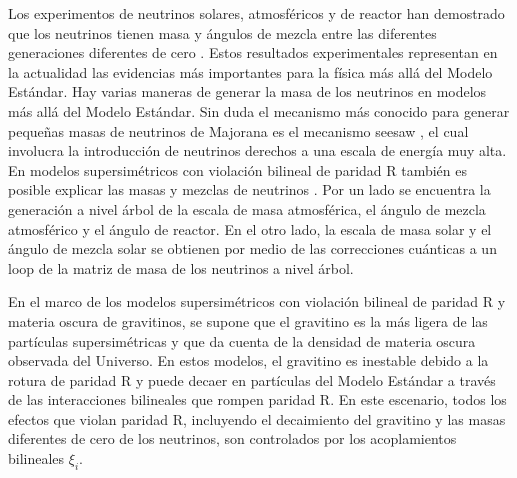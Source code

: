 Los experimentos de neutrinos solares, atmosféricos y de reactor han demostrado que los neutrinos tienen masa y ángulos de mezcla entre las diferentes generaciones diferentes de cero \cite{Ahmad:2002jz,Fukuda:1998mi,Eguchi:2002dm}. Estos resultados experimentales representan en la actualidad las evidencias más importantes para la física más allá del Modelo Estándar. Hay varias maneras de generar la masa de los neutrinos en modelos más allá del Modelo Estándar. Sin duda el mecanismo más conocido para generar pequeñas masas de neutrinos de Majorana es el mecanismo seesaw \cite{Minkowski:1977sc}, el cual involucra la introducción de neutrinos derechos a una escala de energía muy alta. En modelos supersimétricos con violación bilineal de paridad R también es posible explicar las masas y mezclas de neutrinos \cite{Hirsch:2004he,Hirsch:2008ur}. Por un lado se encuentra la generación a nivel árbol de la escala de masa atmosférica, el ángulo de mezcla atmosférico y el ángulo de reactor. En el otro lado, la escala de masa solar y el ángulo de mezcla solar se obtienen por medio de las correcciones cuánticas a un loop de la matriz de masa de los neutrinos a nivel árbol. %



En el marco de los modelos supersimétricos con violación bilineal de paridad R y materia oscura de gravitinos, se supone que el gravitino es la más ligera de las partículas supersimétricas y que da cuenta de la densidad de materia oscura observada del Universo. En estos modelos, el gravitino es inestable debido a la rotura de paridad R y puede decaer en partículas del Modelo Estándar a través de las interacciones bilineales que rompen paridad R. En este escenario, todos los efectos que violan paridad R, incluyendo el decaimiento del gravitino y las masas diferentes de cero de los neutrinos, son controlados por los acoplamientos bilineales $\xi_i$. 

